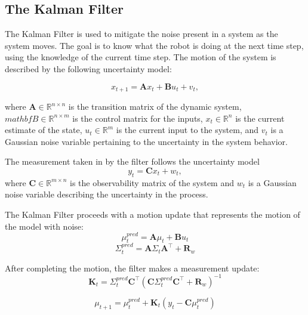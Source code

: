 \subsection*{The Kalman Filter}
The Kalman Filter is used to mitigate the noise present in a system as the system moves.
The goal is to know what the robot is doing at the next time step, using the knowledge of the current time step.
The motion of the system is described by the following uncertainty model:

\begin{equation}
  x_{t+1} = \mathbf{A} x_t + \mathbf{B} u_t + v_t,
\end{equation}

where $\mathbf{A}\in\mathbb{R}^{n\times n}$ is the transition matrix of the dynamic system, $mathbf{B}\in\mathbb{R}^{n\times m}$ is the control matrix for the inputs, $x_{t}\in\mathbb{R}^{n}$ is the current estimate of the state, $u_{t}\in\mathbb{R}^{m}$ is the current input to the system, and $v_t$ is a Gaussian noise variable pertaining to the uncertainty in the system behavior.

The measurement taken in by the filter follows the uncertainty model
\begin{equation}
  y_t = \mathbf{C} x_t + w_t,
\end{equation}
where $\mathbf{C}\in\mathbb{R}^{m\times n}$ is the observability matrix of the system and $w_t$ is a Gaussian noise variable describing the uncertainty in the process.

The Kalman Filter proceeds with a motion update that represents the motion of the model with noise:
\begin{equation}
  \mu_t^{pred} = \mathbf{A} \mu_t + \mathbf{B} u_t
\end{equation}
\begin{equation}
  \Sigma_t^{pred} = \mathbf{A} \Sigma_t \mathbf{A}^\intercal + \mathbf{R}_w
\end{equation}

After completing the motion, the filter makes a measurement update:
\begin{equation}
  \mathbf{K}_t = \Sigma_t^{pred} \mathbf{C}^{\intercal} (\mathbf{C} \Sigma_t^{pred} \mathbf{C}^{\intercal} + \mathbf{R}_w)^{-1}
\end{equation}

\begin{equation}
  \mu_{t+1} = \mu_t^{pred} + \mathbf{K}_{t} (y_t - \mathbf{C} \mu_t^{pred})
\end{equation}

